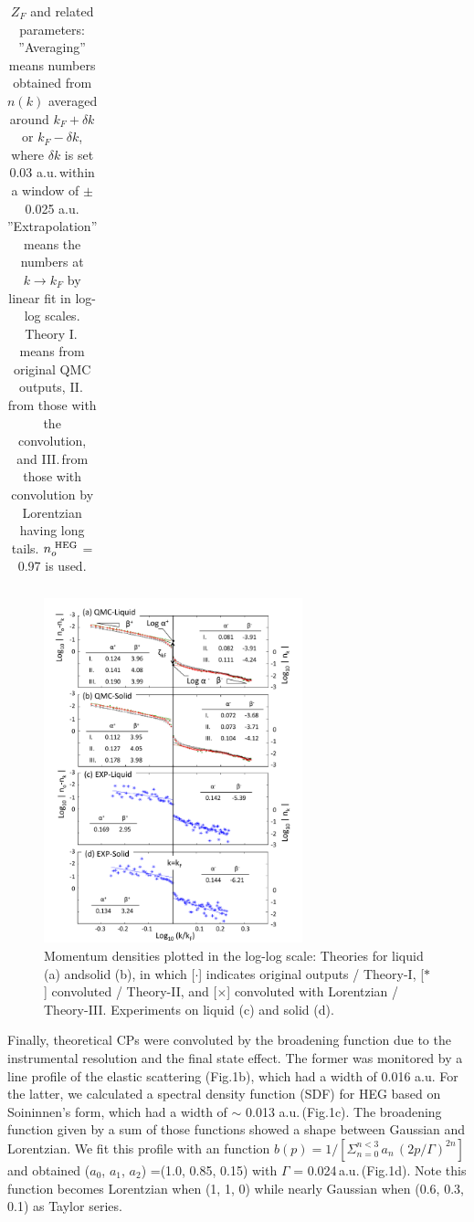 \documentclass[twocolumn,showpacs,showkeys,fleqn,prl,superscriptaddress]{revtex4}%
\newcommand{\nn}[1]{\textnormal{ #1}}
\begin{document}
\begin{table}[b]
\begin{tabular}{llllllll}
\end{tabular}
\caption{
$Z_F$ and related parameters: ''Averaging'' means numbers obtained from $n(k)$ averaged around $k_F+\delta k$ or $k_F-\delta k$, where $\delta k$ is set 0.03 a.u.$\,$within a window of $\pm$0.025 a.u.
''Extrapolation'' means the numbers at $k \to k_F$ by linear fit in log-log scales.
Theory I.\, means from original QMC outputs, II.\,from those with the convolution, and III.\,from those with convolution by Lorentzian having long tails.
$n_o^{\nn{HEG}}$ = 0.97 is used.
} 
\end{table}


\begin{figure}
\includegraphics[bb= 70 10 500 700, width=7.5cm]{fig3.pdf}
\caption{Momentum densities plotted in the log-log scale:  Theories for liquid (a) andsolid (b), in which  [$\cdot$] indicates original outputs / Theory-I, [$*$] convoluted / Theory-II, and [$\times$] convoluted with Lorentzian / Theory-III.  Experiments on liquid (c) and solid (d).
} 
\label{Fig.3}
\end{figure}


Finally, theoretical CPs were convoluted by the broadening function due to the instrumental resolution and the final state effect. 
The former was monitored by a line profile of the elastic scattering (Fig.1b), which had a width of 0.016 a.u.
For the latter, we calculated a spectral density function (SDF) for HEG based on Soininnen's form\cite{soi01}, which had a width of $\sim$ 0.013 a.u.\,(Fig.1c).
The broadening function given by a sum of those functions showed a shape between Gaussian and Lorentzian.    
We fit this profile with an function $b(p) =1/ [ \Sigma_{n=0}^{n<3}\,a_n\,(2p / \Gamma )^{2n} ]$ and obtained ($a_0$, $a_1$, $a_2$) =(1.0, 0.85, 0.15) with $\Gamma$ = 0.024\,a.u.\,(Fig.1d).
Note this function becomes Lorentzian when (1, 1, 0) while nearly Gaussian when (0.6, 0.3, 0.1) as Taylor series. 
\end{document}
